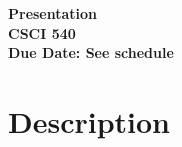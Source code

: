 \documentclass[a4paper, 11pt]{article}
\begin{document}
\noindent

\textbf{Presentation}\\
\textbf{CSCI 540} \\
\textbf{Due Date: See schedule}\\

\section*{Description}
\end{document}
